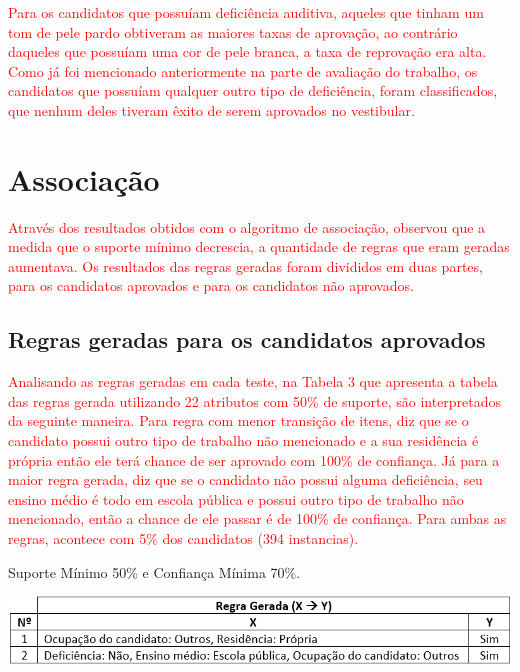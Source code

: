 \par
\textcolor{red}{Para os candidatos que possuíam deficiência auditiva, aqueles que tinham um tom de pele pardo obtiveram as maiores taxas de aprovação, ao contrário daqueles que possuíam uma cor de pele branca, a taxa de reprovação era alta. Como já foi mencionado anteriormente na parte de avaliação do trabalho, os candidatos que possuíam qualquer outro tipo de deficiência, foram classificados, que nenhum deles tiveram êxito de serem aprovados no vestibular.}


\section{Associação}

\textcolor{red}{Através dos resultados obtidos com o algoritmo de associação, observou que a medida que o suporte mínimo decrescia, a quantidade de regras que eram geradas aumentava. Os resultados das regras geradas foram divididos em duas partes, para os candidatos aprovados e para os candidatos não aprovados.}



\subsection{Regras geradas para os candidatos aprovados}

\par
\textcolor{red}{Analisando as regras geradas em cada teste, na Tabela 3 que apresenta a tabela das regras gerada utilizando 22 atributos com 50\% de suporte, são interpretados da seguinte maneira. Para regra com menor transição de itens, diz que se o candidato possui outro tipo de trabalho não mencionado e a sua residência é própria então ele terá chance de ser aprovado com 100\% de confiança. Já para a maior regra gerada, diz que se o candidato não possui alguma deficiência, seu ensino médio é todo em escola pública e possui outro tipo de trabalho não mencionado, então a chance de ele passar é de 100\% de confiança. Para ambas as regras, acontece com 5\% dos candidatos (394 instancias).}


\par
\begin{table}[!htp]
	\begin{center}
    \caption{\label{fig:waveform_fig} Suporte Mínimo 50\% e Confiança Mínima 70\%.}
	\includegraphics[scale=0.75]{Figuras/Suporte_50_atributos_22.png}
	\end{center}
\end{table}

